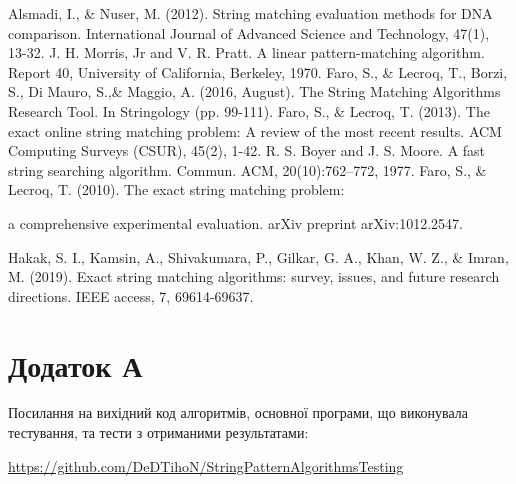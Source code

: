 \documentclass[a4paper,14pt]{extarticle} %
\begin{document}
    \newpage
    
    \begin{thebibliography}{9}
		Alsmadi, I., \& Nuser, M. (2012). String matching evaluation methods for DNA comparison. International Journal of Advanced Science and Technology, 47(1), 13-32.
		J. H. Morris, Jr and V. R. Pratt. A linear pattern-matching algorithm. Report 40, University of California, Berkeley, 1970.
		Faro, S., \& Lecroq, T., Borzi, S., Di Mauro, S.,\& Maggio, A. (2016, August). The String Matching Algorithms Research Tool. In Stringology (pp. 99-111).
		Faro, S., \& Lecroq, T. (2013). The exact online string matching problem: A review of the most recent results. ACM Computing Surveys (CSUR), 45(2), 1-42.
		R. S. Boyer and J. S. Moore. A fast string searching algorithm. Commun.
ACM, 20(10):762–772, 1977.
		Faro, S., \& Lecroq, T. (2010). The exact string matching problem:
		
		a comprehensive experimental evaluation. arXiv preprint arXiv:1012.2547.

		Hakak, S. I., Kamsin, A., Shivakumara, P., Gilkar, G. A., Khan, W. Z., \& Imran, M. (2019). Exact string matching algorithms: survey, issues, and future research directions. IEEE access, 7, 69614-69637.
    \end{thebibliography}
    
	\newpage

	\section*{Додаток А}

	Посилання на вихідний код алгоритмів, основної програми, що виконувала тестування, та тести з отриманими результатами:

	\small{\url{https://github.com/DeDTihoN/StringPatternAlgorithmsTesting}}
\end{document}
